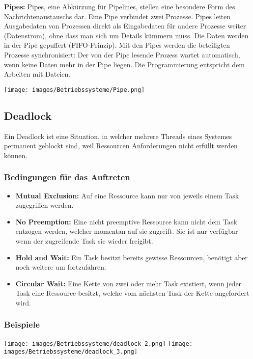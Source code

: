 \textbf{Pipes:} Pipes, eine Abkürzung für Pipelines, stellen eine besondere Form des Nachrichtenaustauschs dar. Eine Pipe verbindet zwei Prozesse. Pipes leiten Ausgabedaten von Prozessen direkt als Eingabedaten für andere
Prozesse weiter (Datenstrom), ohne dass man sich um Details kümmern muss. Die Daten werden in der Pipe gepuffert (FIFO-Prinzip). Mit den Pipes werden die beteiligten Prozesse synchronisiert: Der von der Pipe lesende Prozess wartet automatisch, wenn keine Daten mehr in der Pipe liegen. Die Programmierung entspricht dem Arbeiten mit Dateien.
\begin{center}
    \texttt{[image: images/Betriebssysteme/Pipe.png]}
\end{center}



\subsection{Deadlock}
Ein Deadlock ist eine Situation, in welcher mehrere Threads eines Systemes permanent geblockt sind, weil Ressourcen Anforderungen nicht erfüllt werden können.

\subsubsection{Bedingungen für das Auftreten}
\begin{itemize}
    \item \textbf{Mutual Exclusion:} Auf eine Ressource kann nur von jeweils einem Task zugegriffen werden.
    \item \textbf{No Preemption:} Eine nicht preemptive Ressource kann nicht dem Task entzogen werden, welcher momentan auf sie zugreift. Sie ist nur verfügbar wenn der zugreifende Task sie wieder freigibt.
    \item \textbf{Hold and Wait:} Ein Task besitzt bereits gewisse Ressourcen, benötigt aber noch weitere um fortzufahren.
    \item \textbf{Circular Wait:} Eine Kette von zwei oder mehr Task existiert, wenn jeder Task eine Ressource besitzt, welche vom nächsten Task der Kette angefordert wird.
\end{itemize}

\subsubsection{Beispiele}
\begin{minipage}{\linewidth}
    \texttt{[image: images/Betriebssysteme/deadlock\_2.png]}
    \texttt{[image: images/Betriebssysteme/deadlock\_3.png]}
\end{minipage}

